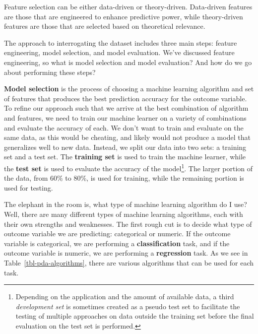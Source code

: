\documentclass[
  letterpaper,
  DIV=11,
  numbers=noendperiod]{scrreprt}
\theoremstyle{definition}
\theoremstyle{remark}
\begin{document}
Feature selection can be either data-driven or theory-driven.
Data-driven features are those that are engineered to enhance predictive
power, while theory-driven features are those that are selected based on
theoretical relevance.

The approach to interrogating the dataset includes three main steps:
feature engineering, model selection, and model evaluation. We've
discussed feature engineering, so what is model selection and model
evaluation? And how do we go about performing these steps?

\textbf{Model selection} is the process of choosing a machine learning
algorithm and set of features that produces the best prediction accuracy
for the outcome variable. To refine our approach such that we arrive at
the best combination of algorithm and features, we need to train our
machine learner on a variety of combinations and evaluate the accuracy
of each. We don't want to train and evaluate on the same data, as this
would be cheating, and likely would not produce a model that generalizes
well to new data. Instead, we split our data into two sets: a training
set and a test set. The \textbf{training set} is used to train the
machine learner, while the \textbf{test set} is used to evaluate the
accuracy of the model\footnote{Depending on the application and the
  amount of available data, a third \emph{development set} is sometimes
  created as a pseudo test set to facilitate the testing of multiple
  approaches on data outside the training set before the final
  evaluation on the test set is performed.}. The larger portion of the
data, from 60\% to 80\%, is used for training, while the remaining
portion is used for testing.

The elephant in the room is, what type of machine learning algorithm do
I use? Well, there are many different types of machine learning
algorithms, each with their own strengths and weaknesses. The first
rough cut is to decide what type of outcome variable we are predicting:
categorical or numeric. If the outcome variable is categorical, we are
performing a \textbf{classification} task, and if the outcome variable
is numeric, we are performing a \textbf{regression} task. As we see in
Table~\ref{tbl-pda-algorithms}, there are various algorithms that can be
used for each task.
\end{document}
